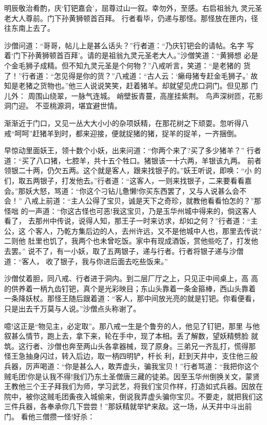明辰敬治肴酌，庆‘钉钯嘉会’，屈尊过山一叙。幸勿外，至感。右启祖翁九
灵元圣老大人尊前。门下孙黄狮顿首百拜。
行者看毕，仍递与那怪。那怪放在匣内，径往东南上去了。

沙僧问道：“哥哥，帖儿上是甚么话头？”行者道：“乃庆钉钯会的请帖。名字
写着‘门下孙黄狮顿首百拜’。请的是祖翁九灵元圣老大人。”沙僧笑道：“黄狮想
必是个金毛狮子成精。但不知九灵元圣是个何物？”八戒听言，笑道：“是老猪的
货了！”行者道：“怎见得是你的货？”八戒道：“古人云：‘癞母猪专赶金毛狮子。’
故知是老猪之货物也。”他三人说说笑笑，赶着猪羊。却就望见虎口洞门。但见那
门儿外：
周围山绕翠，一脉气连城。
峭壁扳青蔓，高崖挂紫荆。
鸟声深树匝，花影洞门迎。
不亚桃源洞，堪宜避世情。

渐渐近于门口，又见一丛大大小小的杂项妖精，在那花树之下顽耍。忽听得八
戒“呵呵”赶猪羊到时，都来迎接，便就捉猪的猪，捉羊的捉羊，一齐捆倒。

早惊动里面妖王，领十数个小妖，出来问道：“你两个来了?买了多少猪羊？”
行者道：“买了八口猪，七腔羊，共十五个牲口。猪银该一十六两，羊银该九两。
前者领银二十两，仍欠五两。这个就是客人，跟来找银子的。”妖王听说，即唤：“小
的们，取五两银子，打发他去。”行者道：“这客人，一则来找银子，二来要看看嘉
会。”那妖大怒，骂道：“你这个刁钻儿惫懒!你买东西罢了，又与人说甚么会不会！”
八戒上前道：“主人公得了宝贝，诚是天下之奇珍，就教他看看怕怎的？”那怪咄
的一声道：“你这古怪也可恶!我这宝贝，乃是玉华州城中得来的，倘这客人看了，
去那州中传说，说得人知，那王子一时来访求，却如之何？”行者道：“主公，这
个客人，乃乾方集后边的人，去州许远，又不是他城中人也，那里去传说?二则他
肚里也饥了，我两个也未曾吃饭。家中有现成酒饭，赏他些吃了，打发他去罢。”
说不了，有一小妖，取了五两银子，递与行者。行者将银子递与沙僧道：“客人，
收了银子，我与你进后面去吃些饭来。”

沙僧仗着胆，同八戒、行者进于洞内。到二层厂厅之上，只见正中间桌上，高
高的供养着一柄九齿钉钯，真个是光彩映目；东山头靠着一条金箍棒，西山头靠着
一条降妖杖。那怪王随后跟着道：“客人，那中间放光亮的就是钉钯。你看便看，
只是出去千万莫与人说。”沙僧点头称谢了。

噫!这正是“物见主，必定取”。那八戒一生是个鲁夯的人，他见了钉钯，那里
与他叙甚么情节，跑上去，拿下来，轮在手中，现了本相。丢了解数，望妖精劈脸
就筑。这行者、沙僧也奔至两山头各拿器械，现了原身。三弟兄一齐乱打，慌得那
怪王急抽身闪过，转入后边，取一柄四明铲，杆长利，赶到天井中，支住他三般
兵器，厉声喝道：“你是甚么人，敢弄虚头，骗我宝贝！”行者骂道：“我把你这个
贼毛团!你是认我不得!我们乃东土圣僧唐三藏的徒弟。因至玉华州倒换关文，蒙贤
王教他三个王子拜我们为师，学习武艺，将我们宝贝作样，打造如式兵器。因放在
院中，被你这贼毛团夤夜入城偷来，倒说我弄虚头骗你宝贝。不要走，就把我们这
三件兵器，各奉承你几下尝尝！”那妖精就举铲来敌。这一场，从天井中斗出前门。
看他三僧攒一怪!好杀：

